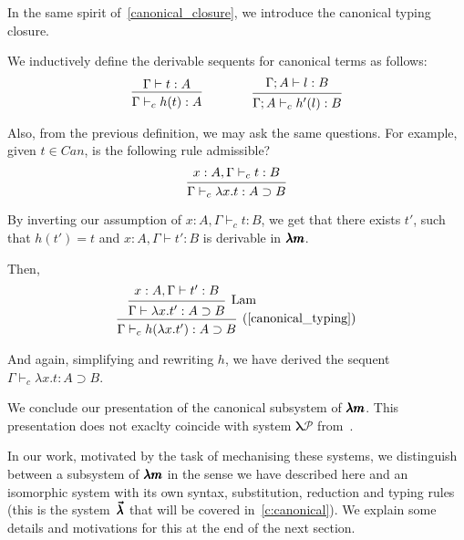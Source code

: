 In the same spirit of~\cref{canonical_closure}, we introduce the canonical typing closure.

\begin{definition}%
  \label{canonical_typing}
  We inductively define the derivable sequents for canonical terms as follows:
  \[
    \begin{prooftree}
      \hypo{ \Gamma \vdash t:A }
      \infer1{ \Gamma \vdash_c h(t):A } 
    \end{prooftree}
    \qquad \qquad
    \begin{prooftree}
      \hypo{ \Gamma ; A \vdash l:B }
      \infer1{ \Gamma ; A \vdash_c h'(l):B }.
    \end{prooftree}
  \]
\end{definition}

Also, from the previous definition, we may ask the same questions.
For example, given $t \in Can$, is the following rule admissible?
\[
  \begin{prooftree}
    \hypo{ x:A, \Gamma \vdash_c t:B }
    \infer1{ \Gamma \vdash_c \lambda x.t : A \supset B } 
  \end{prooftree}
\]

By inverting our assumption of $x:A, \Gamma \vdash_c t:B$, we get that there exists $t'$, such that $h(t') = t$ and $x:A, \Gamma \vdash t':B$ is derivable in $\pmb{\lambda m}$.

Then,
\[
  \begin{prooftree}
    \hypo{ x:A, \Gamma \vdash t':B }
    \infer1[Lam]{ \Gamma \vdash \lambda x . t' : A \supset B }
    \infer1[\text{(\cref{canonical_typing})}]{ \Gamma \vdash_c h(\lambda x . t') : A \supset B }
  \end{prooftree}
\]

And again, simplifying and rewriting $h$, we have derived the sequent $\Gamma \vdash_c \lambda x.t : A \supset B$.

We conclude our presentation of the canonical subsystem of $\pmb{\lambda m}$.
This presentation does not exaclty coincide with system $\pmb{\lambda \mathcal{P}}$ from~\cite[Chapter~3.1]{JCES2002}.

In our work, motivated by the task of mechanising these systems, we distinguish between a subsystem of $\pmb{\lambda m}$ in the sense we have described here and an isomorphic system with its own syntax, substitution, reduction and typing rules (this is the system~$\pmb{\vec \lambda}$ that will be covered in~\cref{c:canonical}).
We explain some details and motivations for this at the end of the next section.

